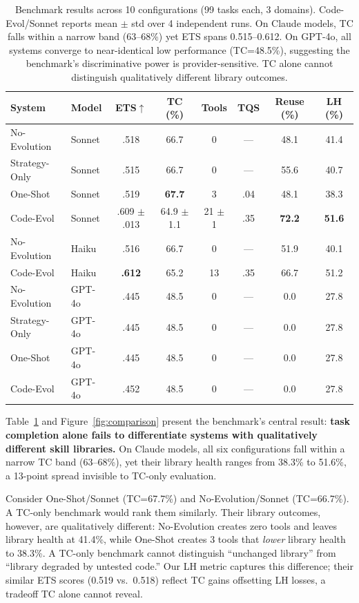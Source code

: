 \documentclass[sigplan,review,anonymous]{acmart}
\begin{document}
\begin{table}[t]
\centering
\small
\begin{tabular}{llcccccc}
\toprule
\textbf{System} & \textbf{Model} & \textbf{ETS}$\uparrow$ & \textbf{TC (\%)} & \textbf{Tools} & \textbf{TQS} & \textbf{Reuse (\%)} & \textbf{LH (\%)} \\
\midrule
No-Evolution & Sonnet & .518 & 66.7 & 0 & --- & 48.1 & 41.4 \\
Strategy-Only & Sonnet & .515 & 66.7 & 0 & --- & 55.6 & 40.7 \\
One-Shot & Sonnet & .519 & \textbf{67.7} & 3 & .04 & 48.1 & 38.3 \\
Code-Evol & Sonnet & .609 $\pm$ .013 & 64.9 $\pm$ 1.1 & 21 $\pm$ 1 & .35 & \textbf{72.2} & \textbf{51.6} \\
\midrule
No-Evolution & Haiku & .516 & 66.7 & 0 & --- & 51.9 & 40.1 \\
Code-Evol & Haiku & \textbf{.612} & 65.2 & 13 & .35 & 66.7 & 51.2 \\
\midrule
No-Evolution & GPT-4o & .445 & 48.5 & 0 & --- & 0.0 & 27.8 \\
Strategy-Only & GPT-4o & .445 & 48.5 & 0 & --- & 0.0 & 27.8 \\
One-Shot & GPT-4o & .445 & 48.5 & 0 & --- & 0.0 & 27.8 \\
Code-Evol & GPT-4o & .452 & 48.5 & 0 & --- & 0.0 & 27.8 \\
\bottomrule
\end{tabular}
\caption{Benchmark results across 10 configurations (99 tasks each, 3 domains). Code-Evol/Sonnet reports mean $\pm$ std over 4 independent runs. On Claude models, TC falls within a narrow band (63--68\%) yet ETS spans 0.515--0.612. On GPT-4o, all systems converge to near-identical low performance (TC=48.5\%), suggesting the benchmark's discriminative power is provider-sensitive. TC alone cannot distinguish qualitatively different library outcomes.}
\label{tab:results}
\end{table}

Table~\ref{tab:results} and Figure~\ref{fig:comparison} present the benchmark's central result: \textbf{task completion alone fails to differentiate systems with qualitatively different skill libraries.} On Claude models, all six configurations fall within a narrow TC band (63--68\%), yet their library health ranges from 38.3\% to 51.6\%, a 13-point spread invisible to TC-only evaluation.

Consider One-Shot/Sonnet (TC=67.7\%) and No-Evolution/Sonnet (TC=66.7\%). A TC-only benchmark would rank them similarly. Their library outcomes, however, are qualitatively different: No-Evolution creates zero tools and leaves library health at 41.4\%, while One-Shot creates 3 tools that \emph{lower} library health to 38.3\%. A TC-only benchmark cannot distinguish ``unchanged library'' from ``library degraded by untested code.'' Our LH metric captures this difference; their similar ETS scores (0.519 vs.\ 0.518) reflect TC gains offsetting LH losses, a tradeoff TC alone cannot reveal.
\end{document}

